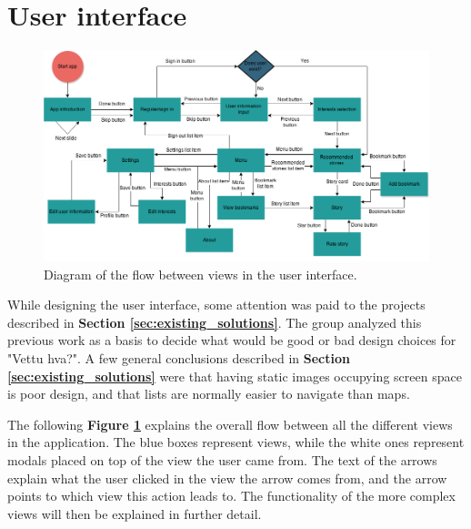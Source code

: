 \section{User interface}


\begin{figure}[h!]
	\centering
	\includegraphics[width=\textwidth]{fig/flow_diagram}
	\caption{Diagram of the flow between views in the user interface.}
	\label{Fig:flow_diagram}
\end{figure}

While designing the user interface, some attention was paid to the projects described in \textbf{Section \ref{sec:existing_solutions}}. The group analyzed this previous work as a basis to decide what would be good or bad design choices for "Vettu hva?". A few general conclusions described in \textbf{Section \ref{sec:existing_solutions}} were that having static images occupying screen space is poor design, and that lists are normally easier to navigate than maps.\newline

The following \textbf{Figure \ref{Fig:flow_diagram}} explains the overall flow between all the different views in the application. The blue boxes represent views, while the white ones represent modals placed on top of the view the user came from. The text of the arrows explain what the user clicked in the view the arrow comes from, and the arrow points to which view this action leads to.  The functionality of the more complex views will then be explained in further detail.



